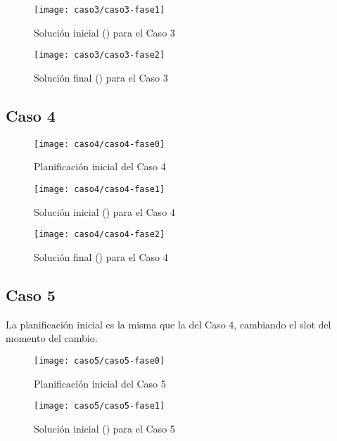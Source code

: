\begin{figure}[!h]
	\centering
	\texttt{[image: caso3/caso3-fase1]}
	\caption{Solución inicial (\faseuno{}) para el Caso 3}
	\label{fig:caso3-fase1}
\end{figure}

\begin{figure}[!h]
	\centering
	\texttt{[image: caso3/caso3-fase2]}
	\caption{Solución final (\fasedos{}) para el Caso 3}
	\label{fig:caso3-fase2}
\end{figure}

\FloatBarrier
\newpage
\subsection{Caso 4}

\begin{figure}[!h]
	\centering
	\texttt{[image: caso4/caso4-fase0]}
	\caption{Planificación inicial del Caso 4}
	\label{fig:caso4-fase0}
\end{figure}

\begin{figure}[!h]
	\centering
	\texttt{[image: caso4/caso4-fase1]}
	\caption{Solución inicial (\faseuno{}) para el Caso 4}
	\label{fig:caso4-fase1}
\end{figure}

\begin{figure}[!h]
	\centering
	\texttt{[image: caso4/caso4-fase2]}
	\caption{Solución final (\fasedos{}) para el Caso 4}
	\label{fig:caso4-fase2}
\end{figure}

\FloatBarrier
\newpage
\subsection{Caso 5}

La planificación inicial es la misma que la del Caso 4, cambiando el slot del momento del cambio.

\begin{figure}[!h]
	\centering
	\texttt{[image: caso5/caso5-fase0]}
	\caption{Planificación inicial del Caso 5}
	\label{fig:caso5-fase0}
\end{figure}

\begin{figure}[!h]
	\centering
	\texttt{[image: caso5/caso5-fase1]}
	\caption{Solución inicial (\faseuno{}) para el Caso 5}
	\label{fig:caso5-fase1}
\end{figure}

